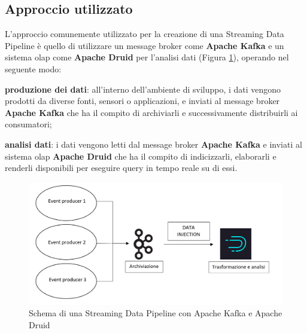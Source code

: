 \subsection{Approccio utilizzato}\label{sec:approccio_utilizzato}
L'approccio comunemente utilizzato per la creazione di una Streaming \gls{Data Pipeline}{} è quello di utilizzare un \gls{message broker}{} come \textbf{Apache Kafka} e un sistema \gls{olap}{} come \textbf{Apache Druid} per l'analisi dati (Figura \ref{fig:data_pipeline}), operando nel seguente modo:\\
\begin{list}{*}
    \item \textbf{produzione dei dati}: all'interno dell'ambiente di sviluppo, i dati vengono prodotti da diverse fonti, sensori o applicazioni, e inviati al \gls{message broker}{} \textbf{Apache Kafka} 
    che ha il compito di archiviarli e successivamente distribuirli ai consumatori;
    \item \item \textbf{analisi dati}: i dati vengono letti dal \gls{message broker}{} \textbf{Apache Kafka} e inviati al sistema \gls{olap}{} \textbf{Apache Druid} che ha il compito di indicizzarli, elaborarli e renderli disponibili per eseguire query in tempo reale su di essi.
\end{list}
\begin{figure}[H]
    \centering
    \includegraphics[width=1\textwidth]{images/componenti/SCHEMA_DATA_PIPELINE.png}
    \caption{Schema di una Streaming Data Pipeline con Apache Kafka e Apache Druid}
    \label{fig:data_pipeline}
\end{figure}
\clearpage
\newpage
\pagestyle{empty}
\null %
\newpage